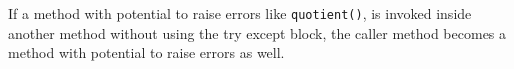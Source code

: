 If a method with potential to raise errors like \texttt{quotient()}, is
invoked inside another method without using the try except block, the
caller method becomes a method with potential to raise errors as well.

\begin{Shaded}
\begin{Highlighting}[]
\NormalTok{) }\OperatorTok{{-}\textgreater{}} \NormalTok{: }
    \OperatorTok{+}

\NormalTok{,}\NormalTok{,}\NormalTok{)}
\NormalTok{(}\NormalTok{)}
\end{Highlighting}
\end{Shaded}

